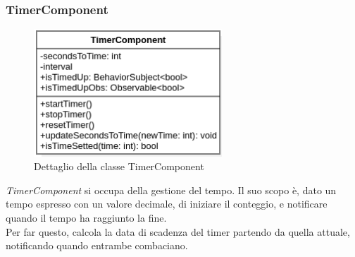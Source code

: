 \subsubsection{TimerComponent}
\begin{figure}[h]
    \centering
    \includegraphics[width=200pt]{images/prog/TimerComponent.png}
    \caption{Dettaglio della classe TimerComponent}
    \label{fig:timer}
\end{figure}
\emph{TimerComponent} si occupa della gestione del tempo. Il suo scopo è, dato un tempo espresso con un valore decimale, di iniziare il conteggio, e notificare quando il tempo ha raggiunto la fine.\\
Per far questo, calcola la data di scadenza del timer partendo da quella attuale, notificando quando entrambe combaciano.
